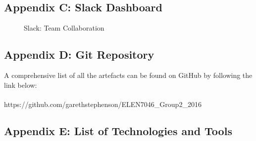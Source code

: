 \documentclass[12pt]{article} %
\begin{document}
	\newpage
	
	\subsection{Appendix C: Slack Dashboard}
	
		
	\begin{figure}[H] %
		\caption{Slack: Team Collaboration}
		\label{fig:speciation}
	\end{figure}
		
		\newpage
	
	\subsection{Appendix D: Git Repository}
	
	A comprehensive list of all the artefacts can be found on GitHub by following the link below:
	\\
	\\
	https://github.com/garethstephenson/ELEN7046\_Group2\_2016\\
	
	
	\newpage
	
	\subsection{Appendix E: List of Technologies and Tools}
	
\end{document}
